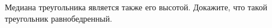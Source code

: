 \begin{ex}
	\begin{condition}
		Медиана треугольника является также его высотой. Докажите, что такой треугольник равнобедренный.
	\end{condition}
\end{ex}